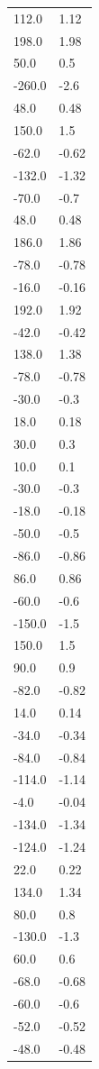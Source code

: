 \begin{longtable}{ll}
112.0 & 1.12 \\
198.0 & 1.98 \\
50.0 & 0.5 \\
-260.0 & -2.6 \\
48.0 & 0.48 \\
150.0 & 1.5 \\
-62.0 & -0.62 \\
-132.0 & -1.32 \\
-70.0 & -0.7 \\
48.0 & 0.48 \\
186.0 & 1.86 \\
-78.0 & -0.78 \\
-16.0 & -0.16 \\
192.0 & 1.92 \\
-42.0 & -0.42 \\
138.0 & 1.38 \\
-78.0 & -0.78 \\
-30.0 & -0.3 \\
18.0 & 0.18 \\
30.0 & 0.3 \\
10.0 & 0.1 \\
-30.0 & -0.3 \\
-18.0 & -0.18 \\
-50.0 & -0.5 \\
-86.0 & -0.86 \\
86.0 & 0.86 \\
-60.0 & -0.6 \\
-150.0 & -1.5 \\
150.0 & 1.5 \\
90.0 & 0.9 \\
-82.0 & -0.82 \\
14.0 & 0.14 \\
-34.0 & -0.34 \\
-84.0 & -0.84 \\
-114.0 & -1.14 \\
-4.0 & -0.04 \\
-134.0 & -1.34 \\
-124.0 & -1.24 \\
22.0 & 0.22 \\
134.0 & 1.34 \\
80.0 & 0.8 \\
-130.0 & -1.3 \\
60.0 & 0.6 \\
-68.0 & -0.68 \\
-60.0 & -0.6 \\
-52.0 & -0.52 \\
-48.0 & -0.48 \\

\end{longtable}
